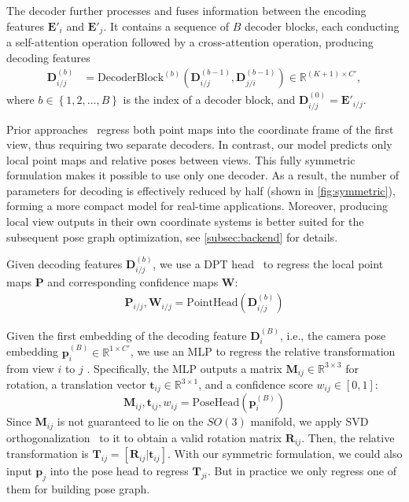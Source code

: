 The decoder further processes and fuses information between the encoding features $\bm E'_i$ and $\bm E'_j$. It contains a sequence of $B$ decoder blocks, each conducting a self-attention operation followed by a cross-attention operation, producing decoding features
\begin{align*}
\bm D_{i/j}^{(b)} &= \text{DecoderBlock}^{(b)} \left(\bm D_{i/j}^{(b-1)}, \bm D_{j/i}^{(b-1)}\right) \in \mathbb{R}^{(K+1) \times C'},
\end{align*}
where $b \in \left\{1, 2, \dots, B\right\}$ is the index of a decoder block, and $\bm D_{i/j}^{(0)}=\bm E'_{i/j}$.


Prior approaches~\cite{dust3r,mast3r} regress both point maps into the coordinate frame of the first view, thus requiring two separate decoders. In contrast, our model predicts only local point maps and relative poses between views. This fully symmetric formulation makes it possible to use only one decoder. As a result, the number of parameters for decoding is effectively reduced by half (shown in \cref{fig:symmetric}), forming a more compact model for real-time applications. Moreover, producing local view outputs in their own coordinate systems is better suited for the subsequent pose graph optimization, see \cref{subsec:backend} for details.

Given decoding features $\bm D_{i/j}^{(b)}$, we use a DPT head~\cite{ranftl2021vision} to regress the local point maps $\bm P$ and corresponding confidence maps $\bm W$:
\begin{align*}
    \bm P_{i/j}, \bm W_{i/j} = \text{PointHead}\left(\bm D_{i/j}^{(b)}\right)
\end{align*}


Given the first embedding of the decoding feature $\bm D_i^{(B)}$, i.e., the camera pose embedding $\bm{p}_i^{(B)} \in \mathbb{R}^{1\times C'}$, we use an MLP to regress the relative transformation from view $i$ to $j$ . Specifically, the MLP outputs a matrix $\bm M_{ij} \in \mathbb{R}^{3\times 3}$ for rotation, a translation vector $\bm t_{ij} \in \mathbb{R}^{3\times1}$, and a confidence score $w_{ij} \in [0,1]$:
\begin{equation*}
    \bm M_{ij}, \bm t_{ij}, w_{ij} = \text{PoseHead}(\bm p_i^{(B)})
\end{equation*}
Since $\bm M_{ij}$ is not guaranteed to lie on the $SO(3)$ manifold, we apply SVD orthogonalization~\cite{levinson2020analysis} to it to obtain a valid rotation matrix $\bm R_{ij}$.
Then, the relative transformation is $\bm T_{ij} = \left[\bm R_{ij} | \bm t_{ij}\right]$.
With our symmetric formulation, we could also input $\bm p_j$ into the pose head to regress $\bm T_{ji}$. But in practice we only regress one of them for building pose graph.

